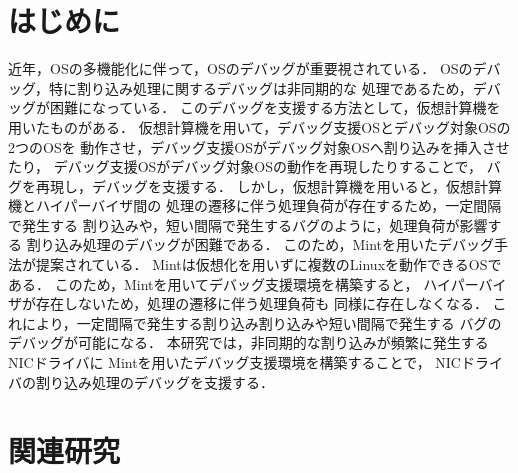 \documentclass[tanilab-enum]{graduate}
\begin{document}
\chapter{はじめに}\label{chap:introduction}
近年，OSの多機能化に伴って，OSのデバッグが重要視されている．
OSのデバッグ，特に割り込み処理に関するデバッグは非同期的な
処理であるため，デバッグが困難になっている．
このデバッグを支援する方法として，仮想計算機を用いたものがある．
仮想計算機を用いて，デバッグ支援OSとデバッグ対象OSの2つのOSを
動作させ，デバッグ支援OSがデバッグ対象OSへ割り込みを挿入させたり，
デバッグ支援OSがデバッグ対象OSの動作を再現したりすることで，
バグを再現し，デバッグを支援する．
しかし，仮想計算機を用いると，仮想計算機とハイパーバイザ間の
処理の遷移に伴う処理負荷が存在するため，一定間隔で発生する
割り込みや，短い間隔で発生するバグのように，処理負荷が影響する
割り込み処理のデバッグが困難である．
このため，Mintを用いたデバッグ手法が提案されている．
Mintは仮想化を用いずに複数のLinuxを動作できるOSである．
このため，Mintを用いてデバッグ支援環境を構築すると，
ハイパーバイザが存在しないため，処理の遷移に伴う処理負荷も
同様に存在しなくなる．
これにより，一定間隔で発生する割り込み割り込みや短い間隔で発生する
バグのデバッグが可能になる．
本研究では，非同期的な割り込みが頻繁に発生するNICドライバに
Mintを用いたデバッグ支援環境を構築することで，
NICドライバの割り込み処理のデバッグを支援する．
\chapter{関連研究}\label{chap:kanren}
\end{document}
